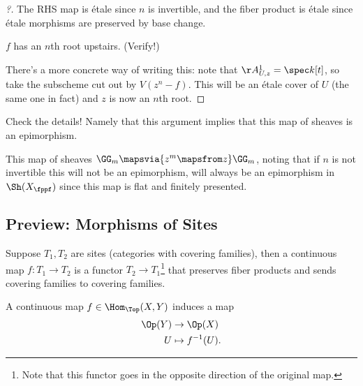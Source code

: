 \begin{example}[?]
\begin{proof}[?]
The RHS map is étale since \(n\) is invertible, and the fiber product is
étale since étale morphisms are preserved by base change.

\begin{claim}

\(f\) has an \(n\)th root upstairs. (Verify!)

\end{claim}

There's a more concrete way of writing this: note that
\(\AA^1_{U, z} = \spec k[t]\), so take the subscheme cut out by
\(V(z^n - f)\). This will be an étale cover of \(U\) (the same one in
fact) and \(z\) is now an \(n\)th root.

\end{proof}

\end{example}

\begin{exercise}[?]

Check the details! Namely that this argument implies that this map of
sheaves is an epimorphism.

\end{exercise}

\begin{remark}

This map of sheaves \(\GG_m \mapsvia{z^m \mapsfrom z} \GG_m\), noting
that if \(n\) is not invertible this will not be an epimorphism, will
always be an epimorphism in \(\Sh(X_\fppf)\) since this map is flat and
finitely presented.

\end{remark}

\hypertarget{preview-morphisms-of-sites}{%
\subsection{Preview: Morphisms of
Sites}\label{preview-morphisms-of-sites}}

\begin{definition}

Suppose \(T_1, T_2\) are sites (categories with covering families), then
a continuous map \(f:T_1 \to T_2\) is a functor
\(T_2 \to T_1\)\footnote{Note that this functor goes in the opposite
  direction of the original map.} that preserves fiber products and
sends covering families to covering families.

\end{definition}

\begin{example}[?]

A continuous map \(f\in \Hom_\Top(X, Y)\) induces a map
\begin{align*}  
\Op(Y) &\to \Op(X) \\
U &\mapsto f^{-1}(U)
.\end{align*}

\end{example}


